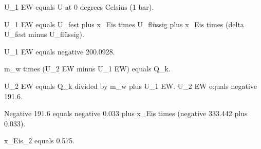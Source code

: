 U_1 EW equals U at 0 degrees Celsius (1 bar).  

U_1 EW equals U_fest plus x_Eis times U_flüssig plus x_Eis times (delta U_fest minus U_flüssig).  

U_1 EW equals negative 200.0928.  

m_w times (U_2 EW minus U_1 EW) equals Q_k.  

U_2 EW equals Q_k divided by m_w plus U_1 EW.  
U_2 EW equals negative 191.6.  

Negative 191.6 equals negative 0.033 plus x_Eis times (negative 333.442 plus 0.033).  

x_Eis_2 equals 0.575.